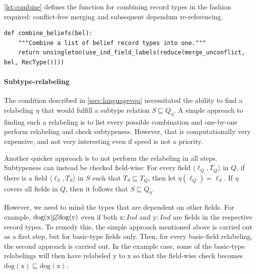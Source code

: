 \autoref{lst:combine} defines the function for combining record types in the fashion required: conflict-free merging and subsequent dependum re-referencing.

\begin{lstlisting}[label={lst:combine},caption={combine}]
def combine_beliefs(bel):
    """Combine a list of belief record types into one."""
    return unsingleton(use_ind_field_labels(reduce(merge_unconflict, bel, RecType())))
\end{lstlisting}

\paragraph{Subtype-relabeling}

The condition described in \autoref{ssec:languagevqa} necessitated the ability to find a relabeling $\eta$ that would fulfill a subtype relation $S \sqsubseteq Q_\eta$.
A simple approach to finding such a relabeling is to list every possible combination and one-by-one perform relabeling and check subtypeness.
However, that is computationally very expensive, and not very interesting even if speed is not a priority.

Another quicker approach is to not perform the relabeling in all steps.
Subtypeness can instead be checked field-wise:
For every field $\langle\ell_Q, T_Q\rangle$ in $Q$, if there is a field $\langle\ell_S, T_S\rangle$ in $S$ such that $T_S \sqsubseteq T_Q$, then let $\eta(\ell_Q) = \ell_S$.
If $\eta$ covers all fields in $Q$, then it follows that $S \sqsubseteq Q_\eta$.

However, we need to mind the types that are dependent on other fields.
For example, $\text{dog}(\text{x}) \cancel{\sqsubseteq} \text{dog}(\text{y})$ even if both $\text{x}:Ind$ and $\text{y}:Ind$ are fields in the respective record types.
To remedy this, the simple approach mentioned above is carried out as a first step, but for basic-type fields only.
Then, for every basic-field relabeling, the second approach is carried out.
In the example case, some of the basic-type relabelings will then have relabeled $\text{y}$ to $\text{x}$ so that the field-wise check becomes $\text{dog}(\text{x}) \sqsubseteq \text{dog}(\text{x})$.


